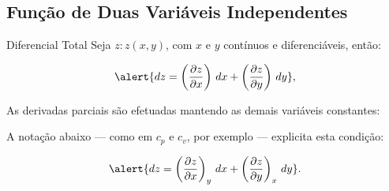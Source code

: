 \subsection{Função de Duas Variáveis Independentes}

    \begin{frame}{Diferencial Total}\vspace*{-2em}
        Seja \alert{$z\!:\!z(x, y)$}, com \alert{$x$} e \alert{$y$} contínuos e diferenciáveis,
        então:

        \begin{equation*}
            \alert{dz =
                \left(
                    \frac{\partial z}{\partial x}
                \right)\,dx +
                \left(
                    \frac{\partial z}{\partial y}
                \right)\,dy},
        \end{equation*}\vspace*{\medskipamount}

        As derivadas parciais são efetuadas mantendo as \alert{demais variáveis constantes}:

        A notação abaixo --- como em \alert{$c_p$} e \alert{$c_v$}, por exemplo ---
        \alert{explicita} esta condição:

        \begin{equation*}
            \alert{dz =
                \left(
                    \frac{\partial z}{\partial x}
                \right)_y\,dx +
                \left(
                    \frac{\partial z}{\partial y}
                \right)_x\,dy}.
        \end{equation*}
    \end{frame}

